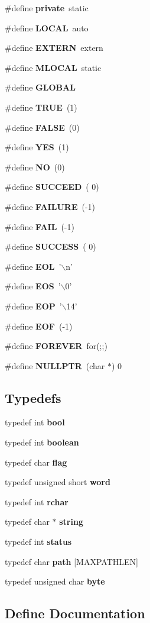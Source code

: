 \begin{CompactItemize}
\#define {\bf private}\ static
\item 
\#define {\bf LOCAL}\ auto
\item 
\#define {\bf EXTERN}\ extern
\item 
\#define {\bf MLOCAL}\ static
\item 
\#define {\bf GLOBAL}
\item 
\#define {\bf TRUE}\ (1)
\item 
\#define {\bf FALSE}\ (0)
\item 
\#define {\bf YES}\ (1)
\item 
\#define {\bf NO}\ (0)
\item 
\#define {\bf SUCCEED}\ ( 0)
\item 
\#define {\bf FAILURE}\ (-1)
\item 
\#define {\bf FAIL}\ (-1)
\item 
\#define {\bf SUCCESS}\ ( 0)
\item 
\#define {\bf EOL}\ '$\backslash$n'
\item 
\#define {\bf EOS}\ '$\backslash$0'
\item 
\#define {\bf EOP}\ '$\backslash$14'
\item 
\#define {\bf EOF}\ (-1)
\item 
\#define {\bf FOREVER}\ for(;;)
\item 
\#define {\bf NULLPTR}\ (char $\ast$) 0
\end{CompactItemize}
\subsection*{Typedefs}
\begin{CompactItemize}
\item 
typedef int {\bf bool}
\item 
typedef int {\bf boolean}
\item 
typedef char {\bf flag}
\item 
typedef unsigned short {\bf word}
\item 
typedef int {\bf rchar}
\item 
typedef char $\ast$ {\bf string}
\item 
typedef int {\bf status}
\item 
typedef char {\bf path} [MAXPATHLEN]
\item 
typedef unsigned char {\bf byte}
\end{CompactItemize}


\subsection{Define Documentation}
